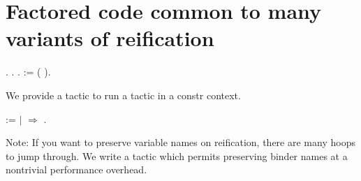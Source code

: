 \begin{coqdoccode}
\end{coqdoccode}
\section{Factored code common to many variants of reification}

\begin{coqdoccode}
\coqdocnoindent
{}  .\coqdoceol
\coqdocnoindent
{}  .\coqdoceol
\coqdocnoindent
{}  .\coqdoceol
\coqdocemptyline
\coqdocnoindent
{}  :=  ( ).\coqdoceol
\coqdocemptyline
\end{coqdoccode}
We provide a tactic to run a tactic in a constr context. \begin{coqdoccode}
\coqdocemptyline
\coqdocnoindent
{}   :=\coqdoceol
\coqdocindent{1.00em}
  \coqdoceol
\coqdocindent{1.00em}
\ensuremath{|} \coqdocvar{\_} \ensuremath{\Rightarrow} \coqdoceol
\coqdocindent{1.00em}
.\coqdoceol
\coqdocemptyline
\end{coqdoccode}
Note: If you want to preserve variable names on reification, there
    are many hoops to jump through. We write a  tactic which
    permits preserving binder names at a nontrivial performance
    overhead. 

